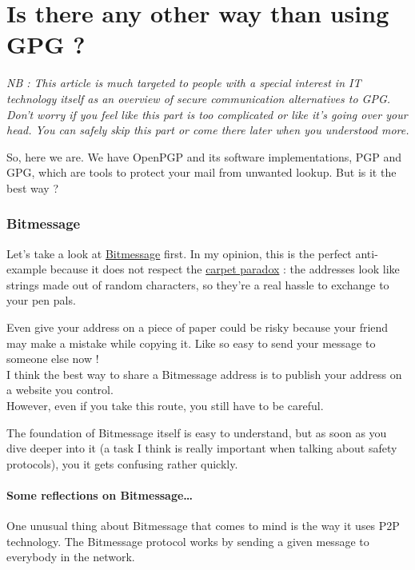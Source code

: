 \chapter{Is there any other way than using GPG ?}

\emph{NB : This article is much targeted to people with a special
interest in IT technology itself as an overview of secure communication
alternatives to GPG.\\Don't worry if you feel like this part is too
complicated or like it's going over your head. You can safely skip this
part or come there later when you understood more.}

So, here we are. We have OpenPGP and its software implementations, PGP
and GPG, which are tools to protect your mail from unwanted lookup. But
is it the best way ?

\subsection{Bitmessage}\label{bitmessage}

Let's take a look at \href{http://n0where.net/bitmessage/}{Bitmessage}
first. In my opinion, this is the perfect anti-example because it does
not respect the
\href{\{filename\}../Informatics/paradoxe-moquette-en.md}{carpet
paradox} : the addresses look like strings made out of random
characters, so they're a real hassle to exchange to your pen pals.

Even give your address on a piece of paper could be risky because your
friend may make a mistake while copying it. Like so easy to send your
message to someone else now !\\I think the best way to share a
Bitmessage address is to publish your address on a website you
control.\\However, even if you take this route, you still have to be
careful.

The foundation of Bitmessage itself is easy to understand, but as soon
as you dive deeper into it (a task I think is really important when
talking about safety protocols), you it gets confusing rather quickly.

\subsubsection{Some reflections on Bitmessage\ldots{}}\label{some-reflections-on-bitmessage}

One unusual thing about Bitmessage that comes to mind is the way it uses
P2P technology. The Bitmessage protocol works by sending a given message
to everybody in the network.


